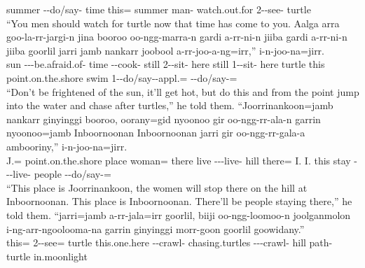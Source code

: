 \begin{exye}
summer --do/say- time this=  summer  man-  watch.out.for 2--see- turtle\\
\ft ``You men should watch for turtle now that  time has come to you.
\exy {}
\gll Aalga arra goo-la-rr-jargi-n jina booroo oo-ngg-marra-n gardi a-rr-ni-n jiiba gardi a-rr-ni-n jiiba goorlil jarri jamb nankarr joobool a-rr-joo-a-ng=irr,'' i-n-joo-na=jirr.\\
sun  ---be.afraid.of-  time --cook- still 2--sit- here still 1--sit- here turtle this  point.on.the.shore swim 1--do/say--appl.= --do/say-=\\
\ft ``Don't be frightened of the sun, it'll get hot, but do this and from the point jump into the water and chase after turtles,'' he told them.
\exy {}
\gll ``Joorrinankoon=jamb nankarr ginyinggi booroo, oorany=gid nyoonoo gir oo-ngg-rr-ala-n garrin nyoonoo=jamb Inboornoonan Inboornoonan jarri gir oo-ngg-rr-gala-a ambooriny,'' i-n-joo-na=jirr.\\
J.= point.on.the.shore  place woman= there live ---live- hill there= I. I. this stay ---live- people --do/say-=\\
\ft ``This place is Joorrinankoon, the women will stop there on the hill at Inboornoonan. This place is Inboornoonan. There'll be people staying there,'' he told them.
\exy {}
\gll ``jarri=jamb a-rr-jala=irr goorlil, biiji oo-ngg-loomoo-n joolganmolon i-ng-arr-ngoolooma-na garrin ginyinggi morr-goon goorlil goowidany.''\\
this= 2--see= turtle this.one.here --crawl- chasing.turtles ---crawl- hill  path- turtle in.moonlight\\

\end{exye}
